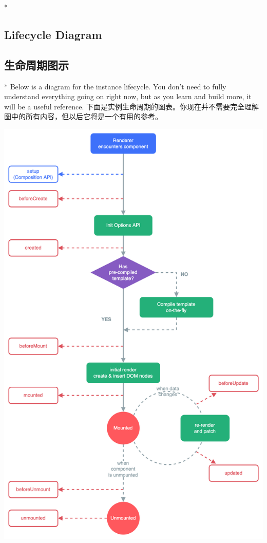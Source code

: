 \begin{paracol}{2}
\switchcolumn[0]*%
\subsection{Lifecycle Diagram}
\switchcolumn
\subsection{生命周期图示}
\switchcolumn[0]*%
Below is a diagram for the instance lifecycle. You don't need to fully
understand everything going on right now, but as you learn and build
more, it will be a useful reference.
\switchcolumn
下面是实例生命周期的图表。你现在并不需要完全理解图中的所有内容，但以后它将是一个有用的参考。
\end{paracol}

\begin{center} 
\includegraphics[scale=0.3]{./img/lifecycle.16e4c08e.png} 
\end{center}

